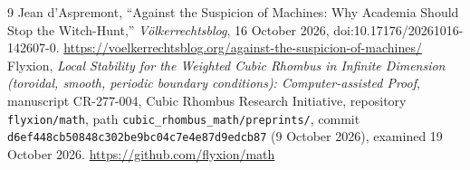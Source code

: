 \documentclass[12pt]{article}
\begin{document}
\begin{thebibliography}{9}
 Jean d'Aspremont, ``Against the Suspicion of Machines: Why Academia Should Stop the Witch-Hunt,'' \emph{V\"olkerrechtsblog}, 16 October 2026, doi:10.17176/20261016-142607-0. \url{https://voelkerrechtsblog.org/against-the-suspicion-of-machines/}
 Flyxion, \emph{Local Stability for the Weighted Cubic Rhombus in Infinite Dimension (toroidal, smooth, periodic boundary conditions): Computer-assisted Proof}, manuscript CR-277-004, Cubic Rhombus Research Initiative, repository \texttt{flyxion/math}, path \texttt{cubic\_rhombus\_math/preprints/}, commit \texttt{d6ef448cb50848c302be9bc04c7e4e87d9edcb87} (9 October 2026), examined 19 October 2026. \url{https://github.com/flyxion/math}
\end{thebibliography}
\end{document}
